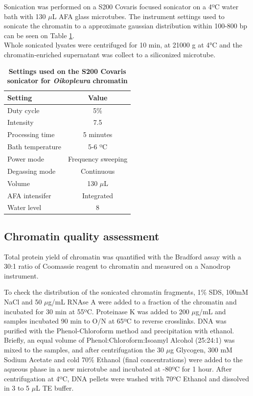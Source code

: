 \documentclass[11pt,twoside,a4paper]{report}
\begin{document}
			Sonication was performed on a S200 Covaris focused sonicator on a 4ºC water bath with 130 $\mu$L AFA glass microtubes. The instrument settings used to sonicate the chromatin to a approximate gaussian distribution within 100-800 bp can be seen on Table \ref{table:CovarisSettings}. \\
			Whole sonicated lysates were centrifuged for 10 min, at 21000 g at 4°C and the chromatin-enriched supernatant was collect to a siliconized microtube.
			
			\begin{table}[!ht]
        		\caption{\bf{Settings used on the S200 Covaris sonicator for \textit{Oikopleura} chromatin}}
        		\begin{center}
	        		\begin{tabular}{l|c}
		           		\textbf{Setting} & \textbf{Value}\\
	        		    \hline
		        		Duty cycle& 5\%\\
	            	    Intensity & 7.5\\
						Processing time & 5 minutes\\
		        		Bath temperature & 5-6 ºC\\
						Power mode & Frequency sweeping\\
		        		Degassing mode & Continuous\\
		        		Volume & 130 $\mu$L\\
		        		AFA intensifer & Integrated\\
	        			Water level & 8\\
	        		\end{tabular}
    		    \end{center}
	        \label{table:CovarisSettings}
		    \end{table}
			
			\subsection{Chromatin quality assessment}
			\label{section:chromQualityAssess}
			Total protein yield of chromatin was quantified with the Bradford assay with a 30:1 ratio of Coomassie reagent to chromatin and measured on a Nanodrop instrument.
			
			To check the distribution of the sonicated chromatin fragments, 1\% SDS, 100mM NaCl and 50 $\mu$g/mL RNAse A were added to a fraction of the chromatin and incubated for 30 min at 55ºC. Proteinase K was added to 200 $\mu$g/mL and samples incubated 90 min to O/N at 65ºC to reverse crosslinks. DNA was purified with the Phenol-Chloroform method and precipitation with ethanol. Briefly, an equal volume of Phenol:Chloroform:Isoamyl Alcohol (25:24:1) was mixed to the samples, and after centrifugation the 30 $\mu$g Glycogen, 300 mM Sodium Acetate and cold 70\% Ethanol (final concentrations) were added to the aqueous phase in a new microtube and incubated at -80ºC for 1 hour. After centrifugation at 4ºC, DNA pellets were washed with 70ºC Ethanol and dissolved in 3 to 5 $\mu$L TE buffer. \\
			
\end{document}
